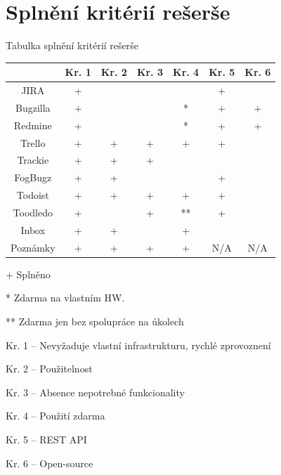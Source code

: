 \documentclass[thesis=B,czech]{FITthesis}[2012/06/26]
\newcommand{\crita}{Nevyžaduje vlastní infrastrukturu, rychlé zprovoznení}
\newcommand{\critb}{Použitelnost}
\newcommand{\critc}{Absence nepotrebné funkcionality}
\newcommand{\critd}{Použití zdarma}
\newcommand{\critf}{REST API}
\newcommand{\critg}{Open-source}
\begin{document}
\chapter{Splnění kritérií rešerše}
	\begin{center}
	\begin{threeparttable}
		\caption{Tabulka splnění kritérií rešerše}
		\label{table:criteria}
		\begin{tabular}{|c||c|c|c|c|c|c|}
			\hline
			           & Kr. 1 & Kr. 2 & Kr. 3 & Kr. 4 & Kr. 5 & Kr. 6 \\ \hline
			JIRA       & +     & ~     & ~     & ~     & +     & ~     \\ \hline
			Bugzilla   & +     & ~     & ~     & *     & +     & +     \\ \hline
			Redmine    & +     & ~     & ~     & *     & +     & +     \\ \hline
			Trello     & +     & +     & +     & +     & +     & ~     \\ \hline
			Trackie    & +     & +     & +     & ~     & ~     & ~     \\ \hline
			FogBugz    & +     & +     & ~     & ~     & +     & ~     \\ \hline
			Todoist    & +     & +     & +     & +     & +     & ~     \\ \hline
			Toodledo   & +     & ~     & +     & **    & +     & ~     \\ \hline
			Inbox      & +     & +     & ~     & +     & ~     & ~     \\ \hline
			Poznámky   & +     & +     & +     & +     & N/A   & N/A   \\ \hline
			
		\end{tabular}
		
		\begin{tablenotes}
			\item[+] Splněno
			\item[*] Zdarma na vlastním HW.
			\item[**] Zdarma jen bez spolupráce na úkolech
			\item Kr. 1 -- \crita
			\item Kr. 2 -- \critb
			\item Kr. 3 -- \critc
			\item Kr. 4 -- \critd
			\item Kr. 5 -- \critf
			\item Kr. 6 -- \critg
		\end{tablenotes}
		
	\end{threeparttable}
	\end{center}
\end{document}
